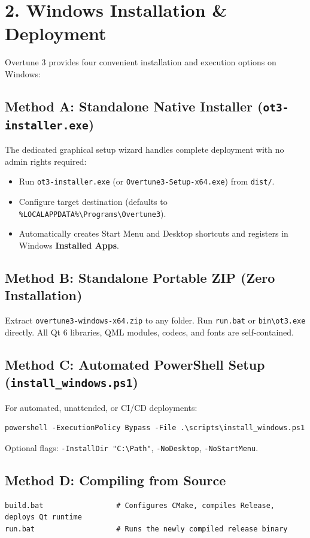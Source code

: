 \documentclass[11pt,a4paper]{article}
\begin{document}
\section*{2. Windows Installation \& Deployment}

Overtune 3 provides four convenient installation and execution options on Windows:

\subsection*{Method A: Standalone Native Installer (\texttt{ot3-installer.exe})}
The dedicated graphical setup wizard handles complete deployment with no admin rights required:
\begin{itemize}[leftmargin=20pt,itemsep=2pt]
  \item Run \texttt{ot3-installer.exe} (or \texttt{Overtune3-Setup-x64.exe}) from \texttt{dist/}.
  \item Configure target destination (defaults to \texttt{\%LOCALAPPDATA\%\textbackslash Programs\textbackslash Overtune3}).
  \item Automatically creates Start Menu and Desktop shortcuts and registers in Windows \textbf{Installed Apps}.
\end{itemize}

\subsection*{Method B: Standalone Portable ZIP (Zero Installation)}
Extract \texttt{overtune3-windows-x64.zip} to any folder. Run \texttt{run.bat} or \texttt{bin\textbackslash ot3.exe} directly. All Qt 6 libraries, QML modules, codecs, and fonts are self-contained.

\subsection*{Method C: Automated PowerShell Setup (\texttt{install\_windows.ps1})}
For automated, unattended, or CI/CD deployments:
\begin{lstlisting}
powershell -ExecutionPolicy Bypass -File .\scripts\install_windows.ps1
\end{lstlisting}
Optional flags: \texttt{-InstallDir "C:\textbackslash Path"}, \texttt{-NoDesktop}, \texttt{-NoStartMenu}.

\subsection*{Method D: Compiling from Source}
\begin{lstlisting}
build.bat                 # Configures CMake, compiles Release, deploys Qt runtime
run.bat                   # Runs the newly compiled release binary
\end{lstlisting}
\end{document}
